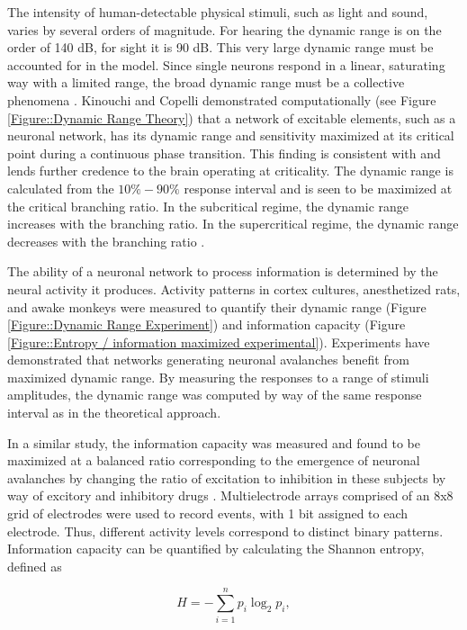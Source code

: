 \documentclass[12pt]{article}
\begin{document}
The intensity of human-detectable physical stimuli, such as light and sound, varies by several orders of magnitude. For hearing the dynamic range is on the order of 140 dB, for sight it is 90 dB. This very large dynamic range must be accounted for in the model. Since single neurons respond in a linear, saturating way with a limited range, the broad dynamic range must be a collective phenomena \cite{Kinouchi2006b}. Kinouchi and Copelli demonstrated computationally (see Figure \ref{Figure::Dynamic Range Theory}) that a network of excitable elements, such as a neuronal network, has its dynamic range and sensitivity maximized at its critical point during a continuous phase transition\cite{Kinouchi2006b}. This finding is consistent with and lends further credence to the brain operating at criticality. The dynamic range is calculated from the $10\%-90\%$ response interval and is seen to be maximized at the critical branching ratio. In the subcritical regime, the dynamic range increases with the branching ratio. In the supercritical regime, the dynamic range decreases with the branching ratio \cite{Larremore2011a, Larremore2012a}.

The ability of a neuronal network to process information is determined by the neural activity it produces. Activity patterns in cortex cultures, anesthetized rats, and awake monkeys were measured to quantify their dynamic range (Figure \ref{Figure::Dynamic Range Experiment}) and information capacity (Figure \ref{Figure::Entropy / information maximized experimental}). Experiments have demonstrated that networks generating neuronal avalanches benefit from maximized dynamic range\cite{Shew2009b}. By measuring the responses to a range of stimuli amplitudes, the dynamic range was computed by way of the same response interval as in the theoretical approach.
   
In a similar study, the information capacity was measured and found to be maximized at a balanced ratio corresponding to the emergence of neuronal avalanches by changing the ratio of excitation to inhibition in these subjects by way of excitory and inhibitory drugs \cite{Shew2011a}. Multielectrode arrays comprised of an 8x8 grid of electrodes were used to record events, with 1 bit assigned to each electrode. Thus, different activity levels correspond to distinct binary patterns. Information capacity can be quantified by calculating the Shannon entropy, defined as

\begin{equation}
H = - \sum^{n}_{i=1}p_{i}\log_{2}p_{i},
\end{equation}
\end{document}
